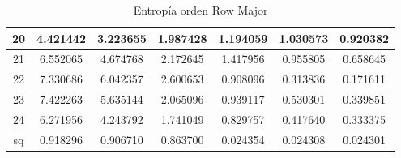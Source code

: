 \documentclass[12pt]{article}
\begin{document}
\begin{table}[h]
\begin{tabular}{|c|c|c|c|c|c|c|}
		\hline
		20&4.421442 &3.223655 &1.987428 &1.194059 &1.030573 &0.920382 \\
		\hline
		21&6.552065 &4.674768 &2.172645 &1.417956 &0.955805 &0.658645 \\
		\hline
		22&7.330686 &6.042357 &2.600653 &0.908096 &0.313836 &0.171611 \\
		\hline
		23&7.422263 &5.635144 &2.065096 &0.939117 &0.530301 &0.339851 \\
		\hline
		24&6.271956 &4.243792 &1.741049 &0.829757 &0.417640 &0.333375 \\
		\hline
		sq&0.918296 &0.906710 &0.863700 &0.024354 &0.024308 &0.024301 \\
		\hline
	\end{tabular}
	\caption{Entropía orden Row Major}
\end{table}



\clearpage
\end{document}
